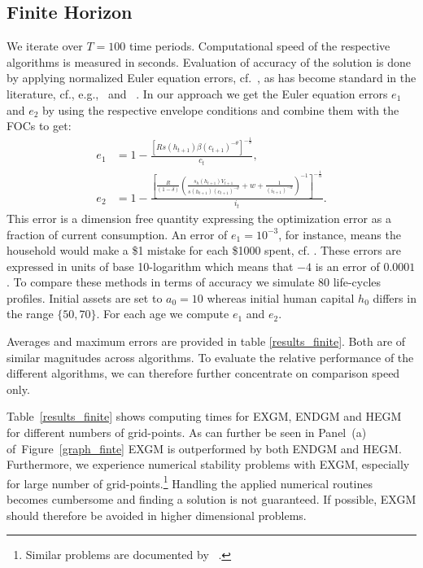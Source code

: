 \documentclass[a4paper,12pt]{article}%
\begin{document}
\subsection{Finite Horizon}

We iterate over $T=100$ time periods. Computational speed of the respective
algorithms is measured in seconds. Evaluation of accuracy of the solution is
done by applying normalized Euler equation errors, cf.~, as has
become standard in the literature, cf., e.g.,~%
and~%
%
. In our approach we get the Euler equation errors $e_{1}$ and $e_{2}$ by
using the respective envelope conditions and combine them with the FOCs to
get:
\begin{align*}
e_{1}  &  =1-\frac{\left[  Rs(h_{t+1})\beta\left(  c_{t+1}\right)  ^{-\theta
}\right]  ^{-\frac{1}{\theta}}}{c_{t}},\\
e_{2}  &  =1-\frac{\left[  \frac{R}{\left(  1-\delta\right)  }\left(
\frac{s_{h}(h_{t+1})V_{t+1}}{s(h_{t+1})\left(  c_{t+1}\right)  ^{-\theta}%
}+w+\frac{1}{\left(  i_{t+1}\right)  ^{-\alpha}}\right)  ^{-1}\right]
^{-\frac{1}{\alpha}}}{i_{t}}.
\end{align*}
This error is a dimension free quantity expressing the optimization error as a
fraction of current consumption. An error of $e_{1}=10^{-3}$, for instance,
means the household would make a \$1 mistake for each \$1000 spent, cf.
%
. These errors are expressed in units of base 10-logarithm which means that
$-4$ is an error of $0.0001$. To compare these methods in terms of accuracy we
simulate 80 life-cycles profiles. Initial assets are set to $a_{0}=10$ whereas
initial human capital $h_{0}$ differs in the range $\{50,70\}$. For each age
we compute $e_{1}$ and $e_{2}$.

Averages and maximum errors are provided in table \ref{results_finite}. Both
are of similar magnitudes across algorithms. To evaluate the relative
performance of the different algorithms, we can therefore further concentrate
on comparison speed only.

Table~\ref{results_finite} shows computing times for EXGM, ENDGM and HEGM for
different numbers of grid-points. As can further be seen in Panel~(a)
of~Figure~\ref{graph_finte} EXGM is outperformed by both ENDGM and HEGM.
Furthermore, we experience numerical stability problems with EXGM, especially
for large number of grid-points.\footnote{Similar problems are documented by~%
%
.} Handling the applied numerical routines becomes cumbersome and finding a
solution is not guaranteed. If possible, EXGM should therefore be avoided in
higher dimensional problems.
\end{document}
